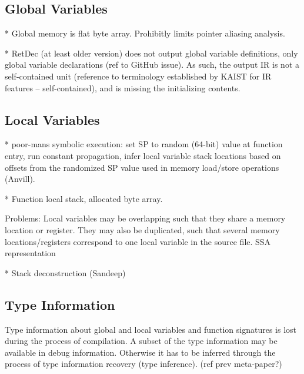 
\subsection{Global Variables}

* Global memory is flat byte array. Prohibitly limits pointer aliasing analysis.

* RetDec (at least older version) does not output global variable definitions, only global variable declarations (ref to GitHub issue). As such, the output IR is not a self-contained unit (reference to terminology established by KAIST for IR features -- self-contained), and is missing the initializing contents.


\subsection{Local Variables}

* poor-mans symbolic execution: set SP to random (64-bit) value at function entry, run constant propagation, infer local variable stack locations based on offsets from the randomized SP value used in memory load/store operations  (Anvill).

* Function local stack, allocated byte array.

Problems: Local variables may be overlapping such that they share a memory location or register. They may also be duplicated, such that several memory locations/registers correspond to one local variable in the source file. SSA representation

* Stack deconstruction (Sandeep)


\subsection{Type Information}

Type information about global and local variables and function signatures is lost during the process of compilation. A subset of the type information may be available in debug information. Otherwise it has to be inferred through the process of type information recovery (type inference). (ref prev meta-paper?)
